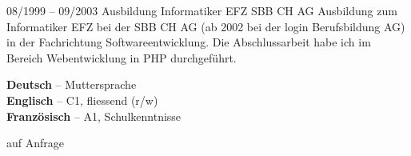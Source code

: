 \documentclass[10pt]{developercv} %
\begin{document}

\vspace{0.5cm} %

\begin{entrylist}
	\entry
	{\footnotesize 08/1999 -- 09/2003}
	{Ausbildung Informatiker EFZ}
	{SBB CH AG}
	{Ausbildung zum Informatiker EFZ bei der SBB CH AG (ab 2002 bei der login Berufsbildung AG) in der Fachrichtung Softwareentwicklung. Die Abschlussarbeit habe ich im Bereich Webentwicklung in PHP durchgeführt.}
\end{entrylist}


\vspace{0.5cm} %
\begin{minipage}[t]{0.45\textwidth} %
	\vspace{-\baselineskip} %


	\textbf{Deutsch} -- Muttersprache\\
	\textbf{Englisch} -- C1, fliessend (r/w)\\
	\textbf{Französisch} -- A1, Schulkenntnisse
\end{minipage}
\hfill %
\begin{minipage}[t]{0.45\textwidth} %
	\vspace{-\baselineskip} %


	auf Anfrage
\end{minipage}

\end{document}
